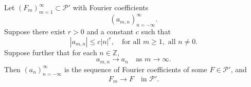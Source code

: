 Let $(F_m)_{m=1}^{\infty} \subset \mathcal{P}'$ with Fourier coefficients
$$(a_{m,n})_{n=-\infty}^{\infty}.$$
Suppose there exist $r > 0$ and a constant $c$ such that
$$|a_{m,n}| \leq c|n|^r, \quad \text{for all } m \geq 1, \text{ all } n \neq 0.$$
Suppose further that for each $n \in \mathbb{Z}$,
$$a_{m,n} \to a_n \quad \text{as } m \to \infty.$$
Then $(a_n)_{n=-\infty}^{\infty}$ is the sequence of Fourier coefficients of some $F \in \mathcal{P}'$,
and
$$F_m \to F \quad \text{in } \mathcal{P}'.$$
